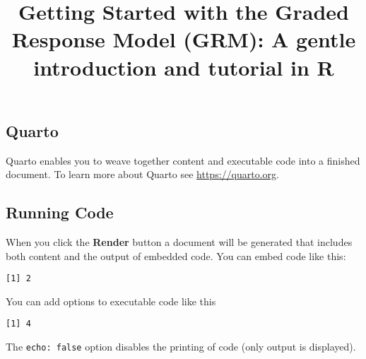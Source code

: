 \documentclass[
  man,
  a4paper,
  colorlinks=true,linkcolor=blue,citecolor=blue,urlcolor=blue]{apa7}
\title{Getting Started with the Graded Response Model (GRM): A gentle
introduction and tutorial in R}
\date{}
\begin{document}
\maketitle
\ifdefined\Shaded\renewenvironment{Shaded}{\begin{tcolorbox}[boxrule=0pt, frame hidden, interior hidden, sharp corners, borderline west={3pt}{0pt}{shadecolor}, enhanced, breakable]}{\end{tcolorbox}}\fi
\hypertarget{quarto}{%
\subsection{Quarto}\label{quarto}}

Quarto enables you to weave together content and executable code into a
finished document. To learn more about Quarto see
\url{https://quarto.org}.

\hypertarget{running-code}{%
\subsection{Running Code}\label{running-code}}

When you click the \textbf{Render} button a document will be generated
that includes both content and the output of embedded code. You can
embed code like this:

\begin{verbatim}
[1] 2
\end{verbatim}

You can add options to executable code like this

\begin{verbatim}
[1] 4
\end{verbatim}

The \texttt{echo:\ false} option disables the printing of code (only
output is displayed).
\end{document}
